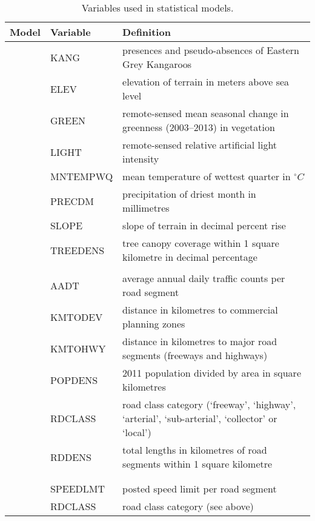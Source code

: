 \begin{table}[!t]
\caption[Variables used in statistical models]{Variables used in statistical models.}
\centering
\begin{tabularx}{0.9\textwidth}{llY} \toprule
Model &Variable    &Definition\\ \midrule 
{}   &KANG        &presences and pseudo-absences of Eastern Grey Kangaroos\\
           		 &ELEV        &elevation of terrain in meters above sea level\\
           		 &GREEN       &remote-sensed mean seasonal change in greenness (2003--2013) in vegetation\\
           		 &LIGHT       &remote-sensed relative artificial light intensity\\
           		 &MNTEMPWQ    &mean temperature of wettest quarter in $^{\circ}C$\\
           		 &PRECDM      &precipitation of driest month in millimetres\\
           		 &SLOPE       &slope of terrain in decimal percent rise\\
           		 &TREEDENS    &tree canopy coverage within 1 square kilometre in decimal percentage\\
&&\\
   &AADT        &average annual daily traffic counts per road segment\\
           		 &KMTODEV     &distance in kilometres to commercial planning zones\\
           		 &KMTOHWY     &distance in kilometres to major road segments (freeways and highways)\\
           		 &POPDENS     &2011 population divided by area in square kilometres\\
           		 &RDCLASS     &road class category (`freeway', `highway', `arterial', `sub-arterial', `collector' or `local')\\
           		 &RDDENS      &total lengths in kilometres of road segments within 1 square kilometre\\
&&\\
 &&\\
    			 &SPEEDLMT    &posted speed limit per road segment	\\
           		 &RDCLASS     &road class category (see above)\\

\end{tabularx}
\end{table}
